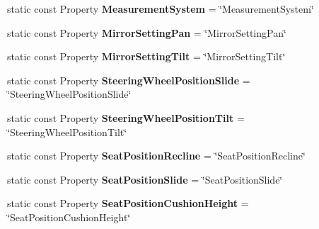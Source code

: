 \begin{DoxyCompactItemize}
\item 
\hypertarget{classVehicleProperty_a4f252ed33c21bfe8ffab942c765ccd40}{static const Property {\bfseries Measurement\+System} = \char`\"{}Measurement\+System\char`\"{}}\label{classVehicleProperty_a4f252ed33c21bfe8ffab942c765ccd40}

\item 
\hypertarget{classVehicleProperty_ace555610ee0cd0737f2d9b439523666a}{static const Property {\bfseries Mirror\+Setting\+Pan} = \char`\"{}Mirror\+Setting\+Pan\char`\"{}}\label{classVehicleProperty_ace555610ee0cd0737f2d9b439523666a}

\item 
\hypertarget{classVehicleProperty_a2ca932f61b72c5d3d11f0bdcefad8d96}{static const Property {\bfseries Mirror\+Setting\+Tilt} = \char`\"{}Mirror\+Setting\+Tilt\char`\"{}}\label{classVehicleProperty_a2ca932f61b72c5d3d11f0bdcefad8d96}

\item 
\hypertarget{classVehicleProperty_a526cb98dbf809a8affff6785f159f997}{static const Property {\bfseries Steering\+Wheel\+Position\+Slide} = \char`\"{}Steering\+Wheel\+Position\+Slide\char`\"{}}\label{classVehicleProperty_a526cb98dbf809a8affff6785f159f997}

\item 
\hypertarget{classVehicleProperty_aca58b520c35739acd692717c6264381f}{static const Property {\bfseries Steering\+Wheel\+Position\+Tilt} = \char`\"{}Steering\+Wheel\+Position\+Tilt\char`\"{}}\label{classVehicleProperty_aca58b520c35739acd692717c6264381f}

\item 
\hypertarget{classVehicleProperty_a66bbcfc91af9bf11536042b8d1f10134}{static const Property {\bfseries Seat\+Position\+Recline} = \char`\"{}Seat\+Position\+Recline\char`\"{}}\label{classVehicleProperty_a66bbcfc91af9bf11536042b8d1f10134}

\item 
\hypertarget{classVehicleProperty_a005604680e4e58d285f0918ef6212449}{static const Property {\bfseries Seat\+Position\+Slide} = \char`\"{}Seat\+Position\+Slide\char`\"{}}\label{classVehicleProperty_a005604680e4e58d285f0918ef6212449}

\item 
\hypertarget{classVehicleProperty_ab218303d4e45858c16144b33c5d0c6cb}{static const Property {\bfseries Seat\+Position\+Cushion\+Height} = \char`\"{}Seat\+Position\+Cushion\+Height\char`\"{}}\label{classVehicleProperty_ab218303d4e45858c16144b33c5d0c6cb}


\end{DoxyCompactItemize}
